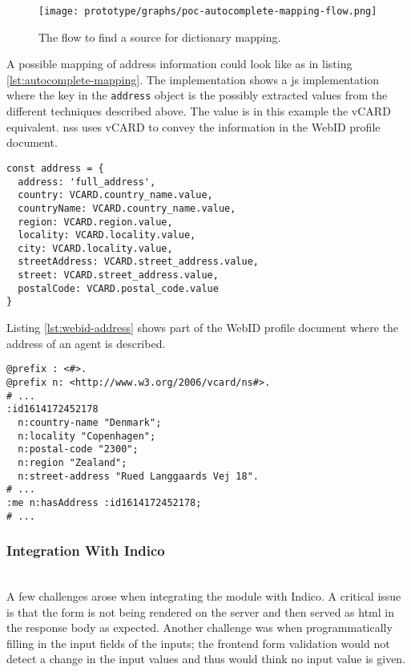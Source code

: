 \begin{figure}[H]
    \centering
    \texttt{[image: prototype/graphs/poc-autocomplete-mapping-flow.png]}
    \caption{The flow to find a source for dictionary mapping.}
    \label{fig:poc-autocomplete-mapping-flow}
\end{figure}

A possible mapping of address information could look like as in listing \ref{lst:autocomplete-mapping}. The implementation shows a \gls{js} implementation where the key in the \texttt{address} object is the possibly extracted values from the different techniques described above. The value is in this example the vCARD \cite{vcard-spec} equivalent. \gls{nss} uses vCARD to convey the information in the WebID profile document.

\begin{lstlisting}[language=Other,columns=fullflexible, caption={Dictionary to map extracted values with predicates from Turtle resource}, label={lst:autocomplete-mapping}]
const address = {
  address: 'full_address',
  country: VCARD.country_name.value,
  countryName: VCARD.country_name.value,
  region: VCARD.region.value,
  locality: VCARD.locality.value,
  city: VCARD.locality.value,
  streetAddress: VCARD.street_address.value,
  street: VCARD.street_address.value,
  postalCode: VCARD.postal_code.value
}
\end{lstlisting}

Listing \ref{lst:webid-address} shows part of the WebID profile document where the address of an agent is described.

\begin{lstlisting}[language=Other,columns=fullflexible, caption={Extraction from WebID profile document showing address.}, label={lst:webid-address}]
@prefix : <#>.
@prefix n: <http://www.w3.org/2006/vcard/ns#>.
# ...
:id1614172452178
  n:country-name "Denmark";
  n:locality "Copenhagen";
  n:postal-code "2300";
  n:region "Zealand";
  n:street-address "Rued Langgaards Vej 18". 
# ...
:me n:hasAddress :id1614172452178;
# ...
\end{lstlisting}

\vspace{0.5cm}
\subsubsection{Integration With Indico}\mbox{}\\

A few challenges arose when integrating the module with Indico. A critical issue is that the form is not being rendered on the server and then served as \gls{html} in the response body as expected. Another challenge was when programmatically filling in the input fields of the inputs; the frontend form validation would not detect a change in the input values and thus would think no input value is given.

